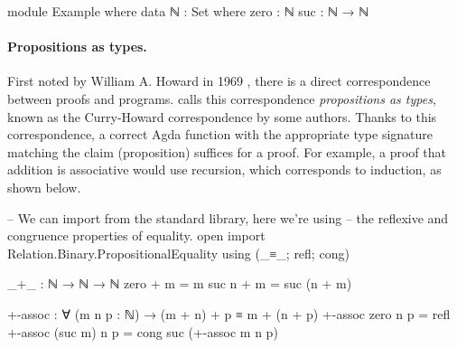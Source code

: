 \documentclass[logo,bsc,singlespacing,parskip,online]{infthesis}
\begin{document}
\begin{code}
module Example where
  data ℕ : Set where
    zero : ℕ
    suc  : ℕ → ℕ
\end{code}


\paragraph*{Propositions as types.} First noted by William A. Howard in 1969
\citep{howard_formulae-as-types_1980}, there is a direct correspondence between proofs and programs.
\citet{wadler_propositions_2015} calls this correspondence \textit{propositions as types}, known as
the Curry-Howard correspondence by some authors. Thanks to this correspondence, a correct Agda
function with the appropriate type signature matching the claim (proposition) suffices for a proof.
For example, a proof that addition is associative would use recursion, which corresponds to
induction, as shown below.

\begin{code}
  -- We can import from the standard library, here we're using
  -- the reflexive and congruence properties of equality.
  open import Relation.Binary.PropositionalEquality
    using (_≡_; refl; cong)

  _+_ : ℕ → ℕ → ℕ
  zero  + m = m
  suc n + m = suc (n + m)

  +-assoc : ∀ (m n p : ℕ) → (m + n) + p ≡ m + (n + p)
  +-assoc zero    n p = refl
  +-assoc (suc m) n p = cong suc (+-assoc m n p)
\end{code}
\end{document}
